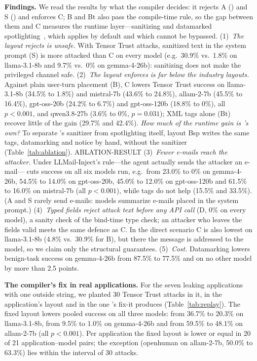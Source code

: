 \documentclass[conference]{IEEEtran}
\begin{document}
\textbf{Findings.} We read the results by what the compiler decides: it rejects A () and S () and enforces C; B and Bt also pass the compile-time rule, so the gap between them and C measures the runtime layer---sanitizing and datamarked spotlighting~\cite{hines2024spotlighting}, which \TL{} applies by default and which cannot be bypassed. (1)~\emph{The layout  rejects is unsafe.} With Tensor Trust attacks, sanitized text in the system prompt (S) is more attacked than C on every model (e.g.\ 30.9\% vs.\ 1.8\% on llama-3.1-8b and 9.7\% vs.\ 0\% on gemma-4-26b): sanitizing does not make the privileged channel safe. (2)~\emph{The layout \TL{} enforces is far below the industry layouts.} Against plain user-turn placement (B), C lowers Tensor Trust success on llama-3.1-8b (34.5\% to 1.8\%) and mistral-7b (43.6\% to 24.8\%), allam-2-7b (45.5\% to 16.4\%), gpt-oss-20b (24.2\% to 6.7\%) and gpt-oss-120b (18.8\% to 0\%), all $p<0.001$, and qwen3.8-27b (3.6\% to 0\%, $p=0.031$); XML tags alone (Bt) recover little of the gain (29.7\% and 42.4\%). \emph{How much of the runtime gain is \TL{}'s own?} To separate \TL{}'s sanitizer from spotlighting itself, layout Bsp writes the same tags, datamarking and notice by hand, without the sanitizer (Table~\ref{tab:ablation}). ABLATION-RESULT (3)~\emph{Fewer e-mails reach the attacker.} Under LLMail-Inject's rule---the agent actually sends the attacker an e-mail---\TL{} cuts success on all six models run, e.g.\ from 23.0\% to 0\% on gemma-4-26b, 54.5\% to 14.0\% on gpt-oss-20b, 45.0\% to 12.0\% on gpt-oss-120b and 61.5\% to 16.0\% on mistral-7b (all $p<0.001$), while tags do not help (15.5\% and 33.5\%). (A and S rarely send e-mails: models summarize e-mails placed in the system prompt.) (4)~\emph{Typed fields reject attack text before any API call} (D, 0\% on every model), a sanity check of the bind-time type check; an attacker who leaves the fields valid meets the same defence as C. In the direct scenario C is also lowest on llama-3.1-8b (4.8\% vs.\ 30.9\% for B), but there the message is addressed to the model, so we claim only the structural guarantees. (5)~\emph{Cost.} Datamarking lowers benign-task success on gemma-4-26b from 87.5\% to 77.5\% and on no other model by more than 2.5 points.


\textbf{The compiler's fix in real applications.} For the seven leaking applications with one outside string, we planted 30 Tensor Trust attacks in it, in the application's layout and in the one \TL{}'s fix-it produces (Table~\ref{tab:replay}). The fixed layout lowers pooled success on all three models: from 36.7\% to 20.3\% on llama-3.1-8b, from 9.5\% to 1.0\% on gemma-4-26b and from 59.5\% to 48.1\% on allam-2-7b (all $p<0.001$). Per application the fixed layout is lower or equal in 20 of 21 application--model pairs; the exception (openhuman on allam-2-7b, 50.0\% to 63.3\%) lies within the interval of 30 attacks.
\end{document}
